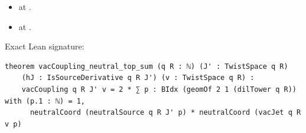 \begin{theorem}[bp-141]
\begin{itemize}
\item \texttt{} at \texttt{}.
\item \texttt{} at \texttt{}.
\end{itemize}
\par Exact Lean signature:
\begin{verbatim}
theorem vacCoupling_neutral_top_sum (q R : ℕ) (J' : TwistSpace q R)
    (hJ : IsSourceDerivative q R J') (v : TwistSpace q R) :
    vacCoupling q R J' v = 2 * ∑ p : BIdx (geomOf 2 1 (dilTower q R)) with (p.1 : ℕ) = 1,
      neutralCoord (neutralSource q R J' p) * neutralCoord (vacJet q R v p)
\end{verbatim}
\end{theorem}

